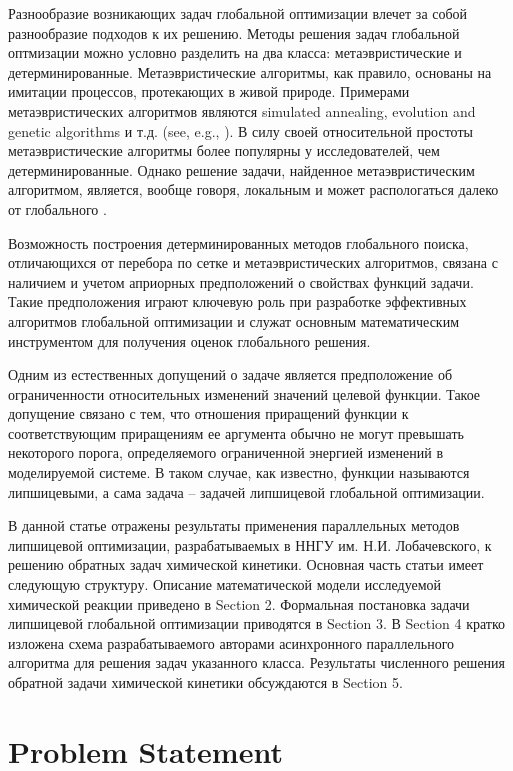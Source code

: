 \documentclass{svproc}
\begin{document}
Разнообразие возникающих задач глобальной оптимизации влечет за собой разнообразие подходов к их решению.
Методы решения задач глобальной оптмизации можно условно разделить на два класса: метаэвристические и детерминированные. Метаэвристические алгоритмы, как правило, основаны на имитации процессов, протекающих в живой природе.
Примерами метаэвристических алгоритмов являются simulated annealing, evolution and genetic algorithms и т.д. (see, e.g., \cite{Battiti2009,Eiben2015}). В силу своей относительной простоты метаэвристические алгоритмы более популярны у исследователей, чем детерминированные.  Однако решение задачи, найденное метаэвристическим алгоритмом, является, вообще говоря, локальным и может распологаться далеко от глобального \cite{Kvasov2018}. 

Возможность построения детерминированных методов глобального поиска, отличающихся от перебора по сетке и метаэвристических алгоритмов, связана с наличием и учетом  априорных предположений о свойствах функций задачи. Такие предположения играют ключевую роль при разработке эффективных алгоритмов глобальной оптимизации и служат основным математическим инструментом для получения оценок глобального решения.

Одним из естественных допущений о задаче является предположение об ограниченности относительных изменений значений целевой функции. Такое допущение связано с тем, что отношения приращений функции к соответствующим приращениям ее аргумента обычно не могут превышать некоторого порога, определяемого ограниченной энергией изменений в моделируемой системе. В таком случае, как известно, функции называются липшицевыми, а сама задача -- задачей липшицевой глобальной оптимизации. 

В данной статье отражены результаты применения параллельных методов липшицевой оптимизации, разрабатываемых в ННГУ им. Н.И. Лобачевского, к решению обратных задач химической кинетики. 
Основная часть статьи имеет следующую структуру. Описание математической модели исследуемой химической реакции приведено в Section 2. Формальная постановка задачи липшицевой глобальной оптимизации приводятся в Section 3. В Section 4 кратко изложена схема разрабатываемого авторами асинхронного параллельного алгоритма для решения задач указанного класса. Результаты численного решения обратной задачи химической кинетики обсуждаются в Section 5.


\section{Problem Statement}\label{Sec_math_mod}
\end{document}
